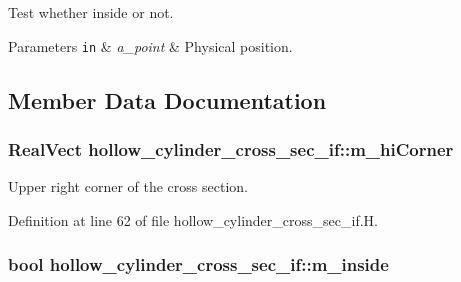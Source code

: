 Test whether inside or not. 


\begin{DoxyParams}[1]{Parameters}
\mbox{\tt in}  & {\em a\+\_\+point} & Physical position. \\
\hline
\end{DoxyParams}


\subsection{Member Data Documentation}
\subsubsection[{\texorpdfstring{m\+\_\+hi\+Corner}{m_hiCorner}}]{\setlength{\rightskip}{0pt plus 5cm}Real\+Vect hollow\+\_\+cylinder\+\_\+cross\+\_\+sec\+\_\+if\+::m\+\_\+hi\+Corner\hspace{0.3cm}{\ttfamily [protected]}}\hypertarget{classhollow__cylinder__cross__sec__if_ad8cda4b5de6b4cf6759769a688f72473}{}\label{classhollow__cylinder__cross__sec__if_ad8cda4b5de6b4cf6759769a688f72473}


Upper right corner of the cross section. 



Definition at line 62 of file hollow\+\_\+cylinder\+\_\+cross\+\_\+sec\+\_\+if.\+H.

\subsubsection[{\texorpdfstring{m\+\_\+inside}{m_inside}}]{\setlength{\rightskip}{0pt plus 5cm}bool hollow\+\_\+cylinder\+\_\+cross\+\_\+sec\+\_\+if\+::m\+\_\+inside\hspace{0.3cm}{\ttfamily [protected]}}\hypertarget{classhollow__cylinder__cross__sec__if_aaa2a47d30acdc5f7f386e206100fa2b8}{}\label{classhollow__cylinder__cross__sec__if_aaa2a47d30acdc5f7f386e206100fa2b8}


